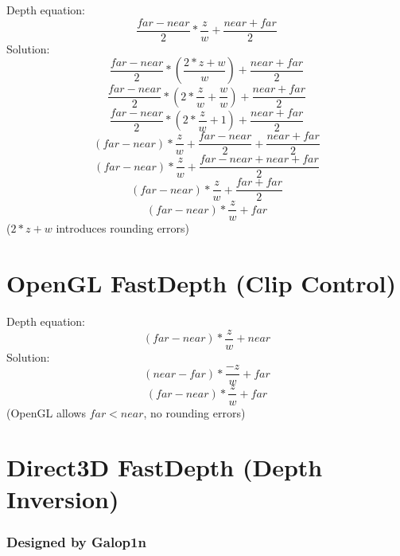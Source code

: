 \documentclass[10pt]{article}
\begin{document}
Depth equation:
\begin{equation}
\frac{far - near}{2} * \frac{z}{w} + \frac{near + far}{2}
\end{equation}
Solution:
\begin{equation}
\frac{far - near}{2} * ( \frac{2 * z + w}{w} ) + \frac{near + far}{2}
\end{equation}
\begin{equation}
\frac{far - near}{2} * ( 2 * \frac{z}{w} + \frac{w}{w} ) + \frac{near + far}{2}
\end{equation}
\begin{equation}
\frac{far - near}{2} * ( 2 * \frac{z}{w} + 1 ) + \frac{near + far}{2}
\end{equation}
\begin{equation}
(far - near) * \frac{z}{w} + \frac{far - near}{2} + \frac{near + far}{2}
\end{equation}
\begin{equation}
(far - near) * \frac{z}{w} + \frac{far - near + near + far}{2}
\end{equation}
\begin{equation}
(far - near) * \frac{z}{w} + \frac{far + far}{2}
\end{equation}
\begin{equation}
(far - near) * \frac{z}{w} + far
\end{equation}
($2 * z + w$ introduces rounding errors)

\section{OpenGL FastDepth (Clip Control)}

Depth equation:
\begin{equation}
(far - near) * \frac{z}{w} + near
\end{equation}
Solution:
\begin{equation}
(near - far) * \frac{-z}{w} + far
\end{equation}
\begin{equation}
(far - near) * \frac{z}{w} + far
\end{equation}
(OpenGL allows $far < near$, no rounding errors)

\section{Direct3D FastDepth (Depth Inversion)}
\subsubsection*{Designed by Galop1n}
\end{document}
